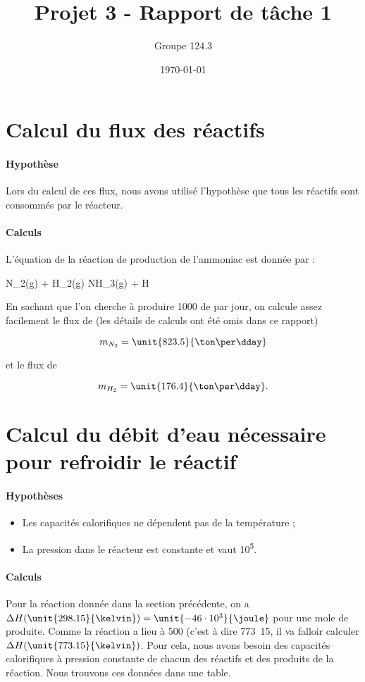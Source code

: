 \documentclass{article}
\title{Projet 3 - Rapport de tâche 1}
\author{Groupe 124.3}
\date{\today}
\begin{document}
\maketitle

\section{Calcul du flux des réactifs}

\paragraph{Hypothèse}
Lors du calcul de ces flux, nous avons utilisé l'hypothèse que tous les réactifs sont 
consommés par le réacteur.

\paragraph{Calculs}
L'équation de la réaction de production de l'ammoniac est donnée par :

	\begin{chemmath}
			N_2(g) + H_2(g) \longrightarrow NH_3(g) + \Delta H
 	\end{chemmath}
	
En sachant que l'on cherche à produire \unit{1000}{\kilo\gram} de  par jour, 
on calcule assez facilement le flux de  (les détails de calculs ont été omis
dans ce rapport)

	$$m_{N_2} = \unit{823.5}{\ton\per\dday}$$

et le flux de 

	$$m_{H_2} = \unit{176.4}{\ton\per\dday}.$$

\section{Calcul du débit d'eau nécessaire pour refroidir le réactif}
\paragraph{Hypothèses}
\begin{itemize}
	\item Les capacités calorifiques ne dépendent pas de la température ;
	\item La pression dans le réacteur est constante et vaut \unit{10^5}{\pascal}.
\end{itemize}

\paragraph{Calculs}
Pour la réaction donnée dans la section précédente, on a $\Delta H(\unit{298.15}{\kelvin})
 = \unit{-46 \cdot 10^3}{\joule}$ pour une mole de  produite.
Comme la réaction a lieu à \unit{500}{\celsius} (c'est à dire \unit{773.15}{\kelvin}, il
va falloir calculer $\Delta H(\unit{773.15}{\kelvin})$. Pour cela, nous avons besoin
des capacités calorifiques à pression constante de chacun des réactifs et des produits
de la réaction. Nous trouvons ces données dans une table.
\end{document}
